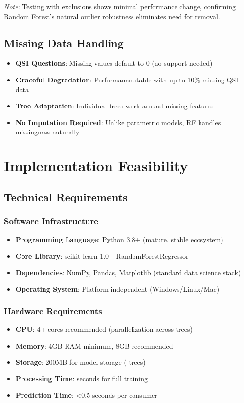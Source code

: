 \textit{Note}: Testing with exclusions shows minimal performance change, confirming Random Forest's natural outlier robustness eliminates need for removal.

\subsection{Missing Data Handling}

\begin{itemize}
    \item \textbf{QSI Questions}: Missing values default to 0 (no support needed)
    \item \textbf{Graceful Degradation}: Performance stable with up to 10\% missing QSI data
    \item \textbf{Tree Adaptation}: Individual trees work around missing features
    \item \textbf{No Imputation Required}: Unlike parametric models, RF handles missingness naturally
\end{itemize}

\section{Implementation Feasibility}

\subsection{Technical Requirements}

\subsubsection{Software Infrastructure}
\begin{itemize}
    \item \textbf{Programming Language}: Python 3.8+ (mature, stable ecosystem)
    \item \textbf{Core Library}: scikit-learn 1.0+ RandomForestRegressor
    \item \textbf{Dependencies}: NumPy, Pandas, Matplotlib (standard data science stack)
    \item \textbf{Operating System}: Platform-independent (Windows/Linux/Mac)
\end{itemize}

\subsubsection{Hardware Requirements}
\begin{itemize}
    \item \textbf{CPU}: 4+ cores recommended (parallelization across trees)
    \item \textbf{Memory}: 4GB RAM minimum, 8GB recommended
    \item \textbf{Storage}: 200MB for model storage (\ModelNineNTrees{} trees)
    \item \textbf{Processing Time}: \ModelNineTrainingTime{} seconds for full training
    \item \textbf{Prediction Time}: <0.5 seconds per consumer
\end{itemize}

